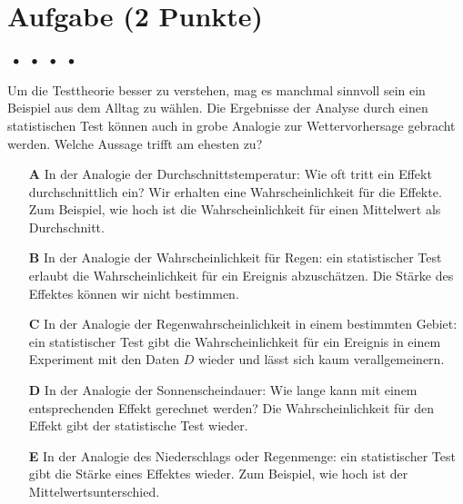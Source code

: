 \documentclass[a4paper, 9pt]{scrartcl}\usepackage[]{graphicx}\usepackage[]{xcolor}
\begin{document}
\section{Aufgabe \hfill (2 Punkte)}

\ifcollection
\begin{flushright}
\tiny\vspace{-2Ex}
\textbf{\examinhaltstart}
\exammodulemathstat $\;\bullet$
\exammodulestat $\;\bullet$
\exammodulestatbbv $\;\bullet$
\exammodulestatversuch $\;\bullet$
\exammodulebiostat
\vspace{-1Ex}
\end{flushright}
\fi




Um die Testtheorie besser zu verstehen, mag es manchmal sinnvoll sein ein Beispiel aus dem Alltag zu wählen. Die Ergebnisse der Analyse durch einen statistischen Test können auch in grobe Analogie zur Wettervorhersage gebracht werden. Welche Aussage trifft am ehesten zu?



\begin{enumerate}
\item [\textbf{A} \msquare] In der Analogie der Durchschnittstemperatur: Wie oft tritt ein Effekt durchschnittlich ein? Wir erhalten eine Wahrscheinlichkeit für die Effekte. Zum Beispiel, wie hoch ist die Wahrscheinlichkeit für einen Mittelwert als Durchschnitt.
\item [\textbf{B} \msquare] In der Analogie der Wahrscheinlichkeit für Regen: ein statistischer Test erlaubt die Wahrscheinlichkeit für ein Ereignis abzuschätzen. Die Stärke des Effektes können wir nicht bestimmen.
\item [\textbf{C} \msquare] In der Analogie der Regenwahrscheinlichkeit in einem bestimmten Gebiet: ein statistischer Test gibt die Wahrscheinlichkeit für ein Ereignis in einem Experiment mit den Daten $D$ wieder und lässt sich kaum verallgemeinern.
\item [\textbf{D} \msquare] In der Analogie der Sonnenscheindauer: Wie lange kann mit einem entsprechenden Effekt gerechnet werden? Die Wahrscheinlichkeit für den Effekt gibt der statistische Test wieder.
\item [\textbf{E} \msquare] In der Analogie des Niederschlags oder Regenmenge: ein statistischer Test gibt die Stärke eines Effektes wieder. Zum Beispiel, wie hoch ist der Mittelwertsunterschied.
\end{enumerate}
\end{document}
